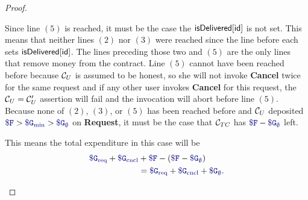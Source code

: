 \begin{proof}
\begin{itemize}
Since line $(5)$ is reached, it must be the case the ${\sf isDelivered}[{\sf id}]$ is not set.
This means that neither lines $(2)$ nor $(3)$ were reached since the line before each sets ${\sf isDelivered}[{\sf id}]$.
The lines preceding those two and $(5)$ are the only lines that remove money from the contract.
Line $(5)$ cannot have been reached before because ${\cal C}_U$ is assumed to be honest, so she will not invoke {\bf Cancel} twice for the same request
and if any other user invokes {\bf Cancel} for this request, the ${\cal C}_U = {\cal C}_U'$ assertion will fail and the invocation will abort before line $(5)$.
Because none of $(2)$, $(3)$, or $(5)$ has been reached before and ${\cal C}_U$ deposited $\consthonestfee > \constgasmin > \constgascancel$ on {\bf Request},
it must be the case that ${\cal C}_{TC}$ has $\consthonestfee - \constgascancel$ left.

This means the total expenditure in this case will be
\begin{align*}
  \constgasrequest + \constgasinvokecancel & + \consthonestfee - (\consthonestfee - \constgascancel) \\
                                           & = \constgasrequest + \constgasinvokecancel + \constgascancel.
\end{align*}
\end{itemize}
\end{proof}

